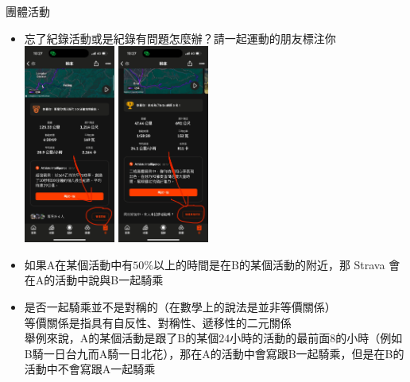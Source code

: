 \begin{frame}{團體活動}
\begin{multicols}{2}
\begin{itemize}
\item 忘了紀錄活動或是紀錄有問題怎麼辦？請一起運動的朋友標注你\\
\includegraphics[width=3cm]{rideTogether.png}
\includegraphics[width=3cm]{rideTogether2.png}
\newpage
\item 如果A在某個活動中有$50\%$以上的時間是在B的某個活動的附近，那 Strava 會在A的活動中說與B一起騎乘
\item 是否一起騎乘並不是對稱的（在數學上的說法是並非等價關係）\\
{\tiny 等價關係是指具有自反性、對稱性、遞移性的二元關係}\\
舉例來說，A的某個活動是跟了B的某個$24$小時的活動的最前面$8$的小時（例如B騎一日台九而A騎一日北花），那在A的活動中會寫跟B一起騎乘，但是在B的活動中不會寫跟A一起騎乘
\end{itemize}
\end{multicols}
\end{frame}

